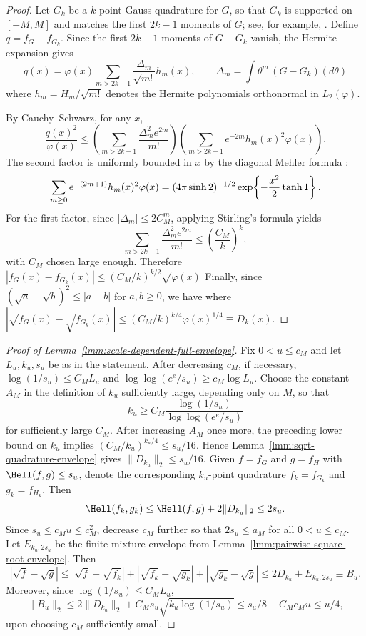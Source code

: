 \documentclass[letterpaper,11pt]{article}
\def\exp{\mathop{\rm exp}}
\theoremstyle{definition}
\begin{document}
\begin{proof}
Let $G_k$ be a $k$-point Gauss quadrature for $G$, so that $G_k$
is supported on $[-M,M]$ and matches the first $2k-1$ moments of $G$;
see, for example, \cite[Theorem~3.3.3]{wu2020polynomial}.  Define
$q=f_G-f_{G_k}$.  Since the first $2k-1$ moments of $G-G_k$ vanish,
the Hermite expansion  gives
\[
q(x)=\varphi(x)\sum_{m>2k-1}
\frac{\Delta_m}{\sqrt{m!}}h_m(x),
\qquad
\Delta_m=\int \theta^m\,(G-G_k)(d\theta)
\]
where 
$h_m=H_m/\sqrt{m!}$ denotes the Hermite polynomials orthonormal in
$L_2(\varphi)$.

By Cauchy--Schwarz, for any $x$,
\[
\frac{q(x)^2}{\varphi(x)}
\le
\left(\sum_{m>2k-1}\frac{\Delta_m^2e^{2m}}{m!}\right)
\left(\sum_{m>2k-1}e^{-2m}h_m(x)^2\varphi(x)\right).
\]
The second factor is uniformly bounded in $x$ by the diagonal Mehler formula
\cite[\href{https://dlmf.nist.gov/18.18.E28}{Eq.~(18.18.28)}]{NIST:DLMF}:
\[
\sum_{m\ge0}e^{-(2m+1)}h_m(x)^2\varphi(x)
=
(4\pi\sinh 2)^{-1/2}
\exp\!\left\{-\frac{x^2}{2}\tanh 1\right\}.
\]
For the first factor, since $|\Delta_m|\le2C_M^m$, applying Stirling's formula yields
\[
\sum_{m>2k-1}\frac{\Delta_m^2e^{2m}}{m!}
\le
\left(\frac{C_M}{k}\right)^k,
\]
with $C_M$ chosen large enough.  Therefore
$|f_G(x)-f_{G_k}(x)|\le (C_M/k)^{k/2} \sqrt{\varphi(x)}$
Finally, since 
$(\sqrt a-\sqrt b)^2\le |a-b|$ for $a,b\ge0$, we have 
 where
$|\sqrt{f_G(x)}-\sqrt{f_{G_k}(x)}| \leq (C_M/k)^{k/4}\varphi(x)^{1/4} \equiv D_k(x)$. 
\end{proof}

\begin{proof}[Proof of Lemma~\ref{lmm:scale-dependent-full-envelope}]
Fix $0<u\le c_M$ and let $L_u,k_u,s_u$ be as in the statement.  
After decreasing $c_M$, if
necessary, $\log(1/s_u)\le C_ML_u$ and
$\log\log(e^e/s_u)\ge c_M\log L_u$.  Choose the constant $A_M$ in the
definition of $k_u$ sufficiently large, depending only on $M$, 
so that
\[
k_u
\ge
C_M
\frac{\log(1/s_u)}{\log\log(e^e/s_u)}
\]
for sufficiently large $C_M$. 
After increasing $A_M$ once more, the preceding lower bound on $k_u$ implies $(C_M/k_u)^{k_u/4}\le s_u/16$. Hence
Lemma~\ref{lmm:sqrt-quadrature-envelope} gives $\|D_{k_u}\|_2\le s_u/16$.  Given
$f=f_G$ and $g=f_H$ with $\Hell(f,g)\leq s_u$, denote the corresponding $k_u$-point quadrature $f_k=f_{G_k}$ and $g_k=f_{H_k}$.  Then
\[
\Hell(f_k,g_k)
\le
\Hell(f,g)+2\|D_{k_u}\|_2
\le
2s_u .
\]
Since $s_u\le c_Mu\le c_M^2$, decrease $c_M$ further so that $2s_u\le a_M$ for all $0<u\le c_M$.
Let $E_{k_u,2s_u}$ be the finite-mixture envelope from
Lemma~\ref{lmm:pairwise-square-root-envelope}. Then
\[
|\sqrt f-\sqrt g|
\le
|\sqrt f-\sqrt {f_k}|
+|\sqrt {f_k}-\sqrt {g_k}|
+|\sqrt {g_k}-\sqrt g|
\le 2D_{k_u}+E_{k_u,2s_u} \equiv B_u .
\]
Moreover, since $\log(1/s_u)\le C_ML_u$,
\[
\|B_u\|_2
\le
2\|D_{k_u}\|_2
+C_Ms_u\sqrt{k_u\log(1/s_u)}
\le
s_u/8+C_Mc_Mu \leq u/4,
\]
upon choosing $c_M$ sufficiently small.
\end{proof}
\end{document}
